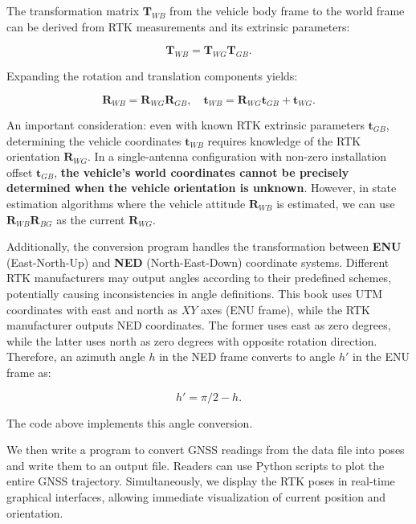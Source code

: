 The transformation matrix $\mathbf{T}_{WB}$ from the vehicle body frame to the world frame can be derived from RTK measurements and its extrinsic parameters:

\begin{equation}\label{key}
	\mathbf{T}_{WB} = \mathbf{T}_{WG} \mathbf{T}_{GB}.
\end{equation}

Expanding the rotation and translation components yields:

\begin{equation}\label{key}
	\mathbf{R}_{WB} = \mathbf{R}_{WG} \mathbf{R}_{GB}, \quad \mathbf{t}_{WB} = \mathbf{R}_{WG} \mathbf{t}_{GB} + \mathbf{t}_{WG}.
\end{equation}

An important consideration: even with known RTK extrinsic parameters $\mathbf{t}_{GB}$, determining the vehicle coordinates $\mathbf{t}_{WB}$ requires knowledge of the RTK orientation $\mathbf{R}_{WG}$. In a single-antenna configuration with non-zero installation offset $\mathbf{t}_{GB}$, \textbf{the vehicle's world coordinates cannot be precisely determined when the vehicle orientation is unknown}. However, in state estimation algorithms where the vehicle attitude $\mathbf{R}_{WB}$ is estimated, we can use $\mathbf{R}_{WB} \mathbf{R}_{BG}$ as the current $\mathbf{R}_{WG}$.

Additionally, the conversion program handles the transformation between \textbf{ENU} (East-North-Up) and \textbf{NED} (North-East-Down) coordinate systems. Different RTK manufacturers may output angles according to their predefined schemes, potentially causing inconsistencies in angle definitions. This book uses UTM coordinates with east and north as $XY$ axes (ENU frame), while the RTK manufacturer outputs NED coordinates. The former uses east as zero degrees, while the latter uses north as zero degrees with opposite rotation direction. Therefore, an azimuth angle $h$ in the NED frame converts to angle $h'$ in the ENU frame as:

\begin{equation}\label{key}
	h' = \pi/2 - h.
\end{equation}

The code above implements this angle conversion.

We then write a program to convert GNSS readings from the data file into poses and write them to an output file. Readers can use Python scripts to plot the entire GNSS trajectory. Simultaneously, we display the RTK poses in real-time graphical interfaces, allowing immediate visualization of current position and orientation.

